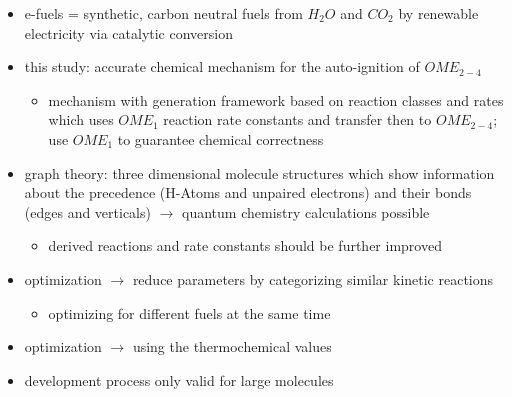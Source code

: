 \documentclass[12pt,oneside,a4paper,english]{article}
\begin{document}
\begin{itemize}
\item{e-fuels = synthetic, carbon neutral fuels from $H_2O$ and $CO_2$ by renewable electricity via catalytic conversion}
\item{this study: accurate chemical mechanism for the auto-ignition of $OME_{2-4}$}

	\begin{itemize}
	\item{mechanism with generation framework based on reaction classes and rates which uses $OME_1$ reaction rate constants and transfer then to $OME_{2-4}$; use $OME_1$ to guarantee chemical correctness}
	\end{itemize}

\item{graph theory: three dimensional molecule structures which show information about the precedence (H-Atoms and unpaired electrons) and their bonds (edges and verticals) $\rightarrow$ quantum chemistry calculations possible}

	\begin{itemize}
	\item{derived reactions and rate constants should be further improved}
	\end{itemize}

\item{optimization $\rightarrow$ reduce parameters by categorizing similar kinetic reactions}

	\begin{itemize}
	\item{optimizing for different fuels at the same time}
	\end{itemize}

\item{optimization $\rightarrow$ using the thermochemical values}
\item{development process only valid for large molecules} \\
\end{itemize}
\end{document}

